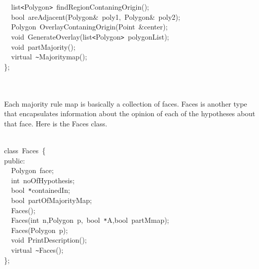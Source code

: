 {\jttstylea ~~\jttstylek list\verb#<#Polygon\verb#>#~findRegionContaningOrigin\jttstylei ()\jttstylek ;\\
\jttstylea ~~\jttstylek bool~areAdjacent\jttstylei (\jttstylek Polygon\&~poly1,~Polygon\&~poly2\jttstylei )\jttstylek ;\\
\jttstylea ~~\jttstylek Polygon~OverlayContaningOrigin\jttstylei (\jttstylek Point~\&center\jttstylei )\jttstylek ;\\
\jttstylea ~~\jttstylej void~\jttstylek GenerateOverlay\jttstylei (\jttstylek list\verb#<#Polygon\verb#>#~polygonList\jttstylei )\jttstylek ;\\
\jttstylea ~~\jttstylej void~\jttstylek partMajority\jttstylei ()\jttstylek ;\\
\jttstylea ~~\jttstylek virtual~\verb#~#Majoritymap\jttstylei ()\jttstylek ;\\
\jttstylei \}\jttstylek ;\\
\jttstylea \\
\jttstylea \jttstylea 
\\

}

Each majority rule map is basically a collection of faces. Faces is another type that encapsulates information about the opinion of 
each of the hypotheses about that face. Here is the Faces class.

{
\noindent \ttfamily
\jttstylea \\
\jttstylee class~\jttstylek Faces~\jttstylei \{\\
\jttstylee public\jttstylek :\\
\jttstylea ~~\jttstylek Polygon~face;\\
\jttstylea ~~\jttstylej int~\jttstylek noOfHypothesis;\\
\jttstylea ~~\jttstylek bool~\verb#*#containedIn;\\
\jttstylea ~~\jttstylek bool~partOfMajorityMap;\\
\jttstylea ~~\jttstylek Faces\jttstylei ()\jttstylek ;\\
\jttstylea ~~\jttstylek Faces\jttstylei (\jttstylej int~\jttstylek n,Polygon~p,~bool~\verb#*#A,bool~partMmap\jttstylei )\jttstylek ;\\
\jttstylea ~~\jttstylek Faces\jttstylei (\jttstylek Polygon~p\jttstylei )\jttstylek ;\\
\jttstylea ~~\jttstylej void~\jttstylek PrintDescription\jttstylei ()\jttstylek ;\\
\jttstylea ~~\jttstylek virtual~\verb#~#Faces\jttstylei ()\jttstylek ;\\
\jttstylei \}\jttstylek ;\\

}

